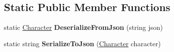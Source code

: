 \subsection*{Static Public Member Functions}
\begin{DoxyCompactItemize}
\item 
\hypertarget{class_dungeon_crawler_1_1_character_1_1_character_afa98f6089012bcc1077fbae13e6abfd5}{}static \hyperlink{class_dungeon_crawler_1_1_character_1_1_character}{Character} {\bfseries Deserialize\+From\+Json} (string json)\label{class_dungeon_crawler_1_1_character_1_1_character_afa98f6089012bcc1077fbae13e6abfd5}

\item 
\hypertarget{class_dungeon_crawler_1_1_character_1_1_character_a0e4ae66b1518972809a7e41a59b0be36}{}static string {\bfseries Serialize\+To\+Json} (\hyperlink{class_dungeon_crawler_1_1_character_1_1_character}{Character} character)\label{class_dungeon_crawler_1_1_character_1_1_character_a0e4ae66b1518972809a7e41a59b0be36}

\end{DoxyCompactItemize}
